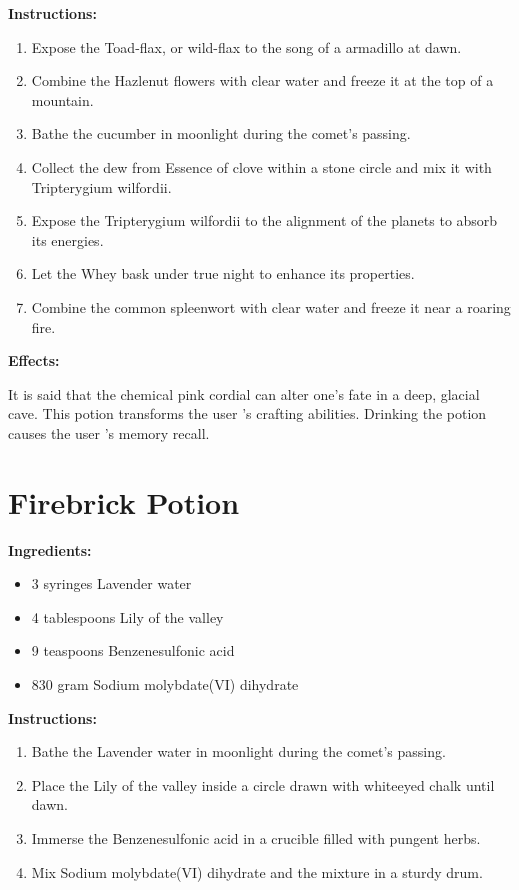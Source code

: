 \documentclass{article}
\begin{document}
\textbf{Instructions:}

\begin{enumerate}
  \item Expose the Toad-flax, or wild-flax to the song of a armadillo at dawn.
  \item Combine the Hazlenut flowers with clear water and freeze it at the top of a mountain.
  \item Bathe the cucumber in moonlight during the comet’s passing.
  \item Collect the dew from Essence of clove within a stone circle and mix it with Tripterygium wilfordii.
  \item Expose the Tripterygium wilfordii to the alignment of the planets to absorb its energies.
  \item Let the Whey bask under true night to enhance its properties.
  \item Combine the common spleenwort with clear water and freeze it near a roaring fire.
\end{enumerate}

\textbf{Effects:}

It is said that the chemical pink cordial can alter one's fate in a deep, glacial cave. This potion transforms the user 's crafting abilities. Drinking the potion causes the user 's memory recall.

\newpage
\section*{Firebrick Potion}

\textbf{Ingredients:}

\begin{itemize}
  \item 3 syringes Lavender water
  \item 4 tablespoons Lily of the valley
  \item 9 teaspoons Benzenesulfonic acid
  \item 830 gram Sodium molybdate(VI) dihydrate
\end{itemize}

\textbf{Instructions:}

\begin{enumerate}
  \item Bathe the Lavender water in moonlight during the comet’s passing.
  \item Place the Lily of the valley inside a circle drawn with whiteeyed chalk until dawn.
  \item Immerse the Benzenesulfonic acid in a crucible filled with pungent herbs.
  \item Mix Sodium molybdate(VI) dihydrate and the mixture in a sturdy drum.
\end{enumerate}
\end{document}
